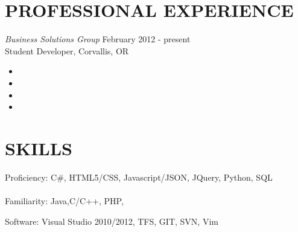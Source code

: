 \documentclass{res}
\begin{document}
\begin{resume}
\vspace{0.2in}
\section{PROFESSIONAL EXPERIENCE}
\vspace{8pt}
{\sl Business Solutions Group} \hfill        February 2012 - present \\
Student Developer, Corvallis, OR

   \begin{itemize} \itemsep -2pt %
   \item
   \item
   \item
   \item
 \end{itemize}
\vspace{0.2in}
\section{SKILLS}
\vspace{8pt}
Proficiency: C\#, HTML5/CSS, Javascript/JSON, JQuery, Python, SQL
\\
\\
Familiarity: Java,C/C++, PHP,

Software: Visual Studio 2010/2012, TFS, GIT, SVN, Vim

\end{resume}
\end{document}
